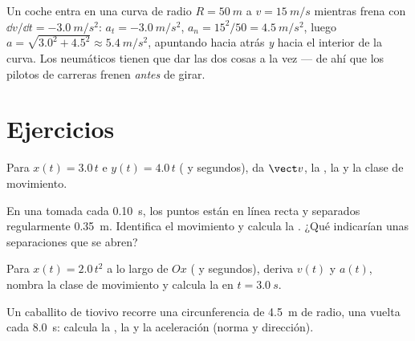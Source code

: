 \begin{example}\label{ex:g12:kinematics-2d:bend}
Un coche entra en una curva de radio $R = \qty{50}{m}$ a
$v = \qty{15}{m/s}$ mientras frena con
$\dd v/\dd t = \qty{-3.0}{m/s^2}$: $a_t = \qty{-3.0}{m/s^2}$,
$a_n = 15^2/50 = \qty{4.5}{m/s^2}$, luego
$a = \sqrt{3.0^2 + 4.5^2} \approx \qty{5.4}{m/s^2}$, apuntando hacia
atrás \emph{y} hacia el interior de la curva. Los neumáticos tienen que
dar las dos cosas a la vez --- de ahí que los pilotos de carreras frenen
\emph{antes} de girar.
\end{example}

\section{Ejercicios}

\begin{exercise}[$\star$]\label{exo:g12:kinematics-2d:1}
Para $x(t) = 3.0\,t$ e $y(t) = 4.0\,t$ ( y segundos), da
$\vect v$, la , la  y la clase de movimiento.
\end{exercise}

\begin{exercise}[$\star$]\label{exo:g12:kinematics-2d:2}
En una  tomada cada \qty{0.10}{s}, los puntos están en
línea recta y separados regularmente \qty{0.35}{m}. Identifica el
movimiento y calcula la . ¿Qué indicarían unas separaciones que
se abren?
\end{exercise}

\begin{exercise}[$\star$]\label{exo:g12:kinematics-2d:3}
Para $x(t) = 2.0\,t^2$ a lo largo de $Ox$ ( y segundos), deriva
$v(t)$ y $a(t)$, nombra la clase de movimiento y calcula la  en
$t = \qty{3.0}{s}$.
\end{exercise}

\begin{exercise}[$\star$]\label{exo:g12:kinematics-2d:4}
Un caballito de tiovivo recorre una circunferencia de \qty{4.5}{m} de
radio, una vuelta cada \qty{8.0}{s}: calcula la , la  y
la aceleración (norma y dirección).
\end{exercise}

